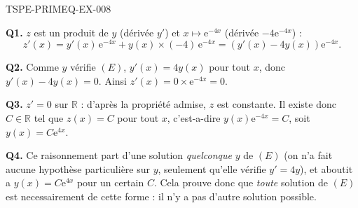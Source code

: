 \begin{corrige}{TSPE-PRIMEQ-EX-008}

\textbf{Q1.} $z$ est un produit de $y$ (dérivée $y'$) et $x \mapsto \mathrm{e}^{-4x}$ (dérivée $-4\mathrm{e}^{-4x}$) :
\[
  z'(x) = y'(x)\,\mathrm{e}^{-4x} + y(x)\times(-4)\,\mathrm{e}^{-4x} = \left(y'(x) - 4y(x)\right)\mathrm{e}^{-4x}.
\]

\textbf{Q2.} Comme $y$ vérifie $(E)$, $y'(x) = 4y(x)$ pour tout $x$, donc $y'(x)-4y(x)=0$. Ainsi $z'(x) = 0 \times \mathrm{e}^{-4x} = 0$.

\textbf{Q3.} $z' = 0$ sur $\mathbb{R}$ : d'après la propriété admise, $z$ est constante. Il existe donc $C \in \mathbb{R}$ tel que $z(x)=C$ pour tout $x$, c'est-a-dire $y(x)\mathrm{e}^{-4x}=C$, soit $y(x) = C\mathrm{e}^{4x}$.

\textbf{Q4.} Ce raisonnement part d'une solution \emph{quelconque} $y$ de $(E)$ (on n'a fait aucune hypothèse particulière sur $y$, seulement qu'elle vérifie $y'=4y$), et aboutit a $y(x)=C\mathrm{e}^{4x}$ pour un certain $C$. Cela prouve donc que \emph{toute} solution de $(E)$ est necessairement de cette forme : il n'y a pas d'autre solution possible.

\end{corrige}
